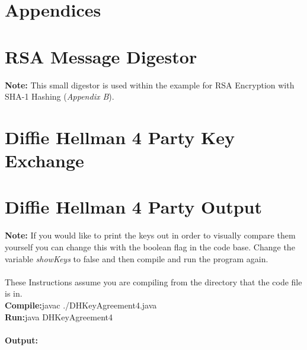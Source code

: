 \documentclass[a4paper, twoside, 11pt]{article}
\begin{document}
\newpage
\section*{Appendices}
\appendix
\section{RSA Message Digestor}
\textbf{Note:} This small digestor is used within the example for RSA Encryption with SHA-1 Hashing (\textit{Appendix B}).

\newpage
\section{Diffie Hellman 4 Party Key Exchange}

\newpage
\section{Diffie Hellman 4 Party Output}
\textbf{Note:} If you would like to print the keys out in order to visually compare them yourself you can change this with the boolean flag in the code base. Change the variable \textit{showKeys} to false and then compile and run the program again. \\
\\
These Instructions assume you are compiling from the directory that the code file is in.\\
\textbf{Compile:}javac ./DHKeyAgreement4.java \\
\textbf{Run:}java DHKeyAgreement4
\\
\\
\textbf{Output:}

\end{document}
